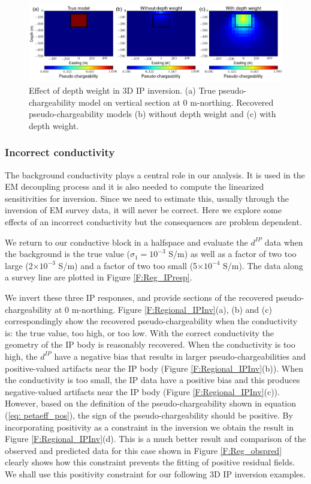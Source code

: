 \documentclass[a4paper, 11pt]{article}
\newcommand{\dip}{d^{IP}}
\begin{document}
\begin{figure}[htb]
  \centering
  \includegraphics[width=1.\textwidth]{figures/Depthweight.png}
  \caption{Effect of depth weight in 3D IP inversion. (a) True pseudo-chargeability model on vertical section at 0 m-northing. Recovered pseudo-chargeability models (b) without depth weight and (c) with depth weight.}
  \label{F:Depthweight}
\end{figure}
\clearpage

\subsubsection{Incorrect conductivity}
The background conductivity plays a central role in our analysis. It is used in the EM decoupling process and it is also needed to compute the linearized sensitivities for inversion. Since we need to estimate this, usually through the inversion of EM survey data, it will never be correct. Here we explore some effects of an incorrect conductivity but  the consequences are problem dependent.

We return to our conductive block in a halfspace and evaluate the $\dip$ data when the background is the true value ($\sigma_1 = 10^{-3}$ S/m) as well as a factor of two too large (2$\times10^{-3}$ S/m) and a factor of two too small (5$\times10^{-4}$ S/m). The data along a survey line are plotted in Figure \ref{F:Reg_IPresp}.

We invert these three IP responses, and provide sections of the recovered pseudo-chargeability at 0 m-northing. 
Figure \ref{F:Regional_IPInv}(a), (b) and (c) correspondingly show the recovered pseudo-chargeability when the conductivity is: the true value, too high, or too low.  
With the correct conductivity the geometry of the IP body is reasonably recovered. 
When the conductivity is too high, the $\dip$ have a negative bias that results in larger pseudo-chargeabilities and positive-valued artifacts near the IP body (Figure \ref{F:Regional_IPInv}(b)).  
When the conductivity is too small, the IP data have a positive bias and this produces  negative-valued artifacts near the IP body (Figure \ref{F:Regional_IPInv}(c)). However, based on the  definition of the pseudo-chargeability shown in equation (\ref{eq: petaeff_pos}), the sign of the pseudo-chargeability should be positive. By incorporating positivity as a constraint in the inversion we obtain the result in  Figure \ref{F:Regional_IPInv}(d).  This is a much better result and comparison of the observed and predicted data for this case shown in Figure \ref{F:Reg_obspred} clearly shows how this constraint prevents the fitting of positive residual fields. We shall use this positivity  constraint for our following 3D IP inversion examples. 
\end{document}
